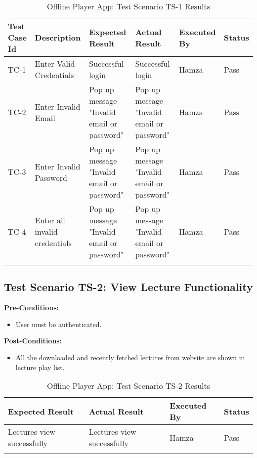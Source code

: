 \bigskip

\begin{longtable}{|p{1cm}|p{3cm}|p{2cm}|p{2cm}|p{2cm}|p{2cm}|}
\hline
\textbf{Test Case Id} & \textbf{Description} & \textbf{Expected Result} & \textbf{Actual Result} & \textbf{Executed By} & \textbf{Status}\\
\hline
TC-1 &
Enter Valid Credentials &
Successful login &
Successful login &
Hamza &
Pass \\
\hline


TC-2 &
Enter Invalid Email &
Pop up message "Invalid email or password" &
Pop up message "Invalid email or password" &
Hamza &
Pass \\
\hline

TC-3 &
Enter Invalid Password &
Pop up message "Invalid email or password" &
Pop up message "Invalid email or password" &
Hamza &
Pass \\
\hline



TC-4 &
Enter all invalid credentials &
Pop up message "Invalid email or password" &
Pop up message "Invalid email or password" &
Hamza &
Pass \\
\hline




\caption{Offline Player App: Test Scenario TS-1 Results}
\end{longtable}


\subsection{Test Scenario TS-2: View Lecture Functionality}

\textbf{Pre-Conditions: }
\begin{itemize}

\item User must be authenticated.

\end{itemize}


\textbf{Post-Conditions: }
\begin{itemize}

\item All the downloaded and recently fetched lectures from website are shown in lecture play list.

\end{itemize}



\bigskip

\begin{longtable}{|p{4cm}|p{4cm}|p{2cm}|p{2cm}|}
\hline
\textbf{Expected Result} & \textbf{Actual Result} & \textbf{Executed By} & \textbf{Status}\\
\hline
Lectures view successfully &
Lectures view successfully &
Hamza &
Pass \\
\hline

\caption{Offline Player App: Test Scenario TS-2 Results}
\end{longtable}

